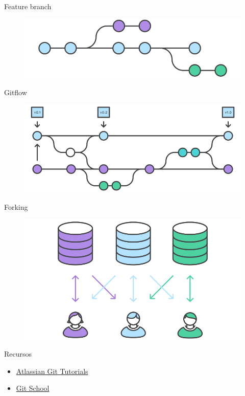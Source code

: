 \documentclass{beamer}
\begin{document}
\begin{frame}{Feature branch}
\begin{figure}
\centering
\includegraphics[width=0.7\linewidth]{Images/feature.png}
\end{figure}
\end{frame}

\begin{frame}{Gitflow}
\begin{figure}
\centering
\includegraphics[width=0.7\linewidth]{Images/gitflow.png}
\end{figure}
\end{frame}

\begin{frame}{Forking}
\begin{figure}
\centering
\includegraphics[width=0.7\linewidth]{Images/forking.png}
\end{figure}
\end{frame}

\begin{frame}{Recursos}
\begin{itemize}
\item \href{https://www.atlassian.com/git/tutorials}{Atlassian Git Tutorials}
\item \href{https://try.github.io/levels/1/challenges/1}{Git School}
\end{itemize}

\end{frame}
\end{document}
